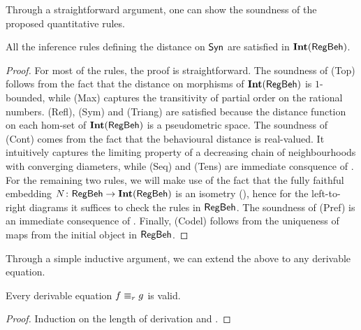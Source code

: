 Through a straightforward argument, one can show the soundness of the proposed quantitative rules.
\begin{lemma}\label{lem:soundness_sublemma}
		All the inference rules defining the distance on $\mathsf{Syn}$ are satisfied in $\mathbf{Int}(\mathsf{RegBeh})$.
	\end{lemma}
	\begin{proof}
		For most of the rules, the proof is straightforward. The soundness of \textsf{(Top)} follows from the fact that the distance on morphisms of $\mathbf{Int}(\mathsf{RegBeh})$ is $1$-bounded, while \textsf{(Max)} captures the transitivity of partial order on the rational numbers. \textsf{(Refl)}, \textsf{(Sym)} and \textsf{(Triang)} are satisfied because the distance function on each hom-set of $\mathbf{Int}(\mathsf{RegBeh})$ is a pseudometric space. The soundness of \textsf{(Cont)} comes from the fact that the behavioural distance is real-valued. It intuitively captures the limiting property of a decreasing chain of neighbourhoods with converging diameters, while \textsf{(Seq)} and \textsf{(Tens)} are immediate consquence of . For the remaining two rules, we will make use of the fact that the fully faithful embedding $N \colon \mathsf{RegBeh} \to \mathbf{Int}(\mathsf{RegBeh})$ is an isometry (), hence for the left-to-right diagrams it suffices to check the rules in $\mathsf{RegBeh}$. The soundness of \textsf{(Pref)} is an immediate consequence of . Finally, \textsf{(Codel)} follows from the uniqueness of maps from the initial object in $\mathsf{RegBeh}$.
		\end{proof}
		Through a simple inductive argument, we can extend the above to any derivable equation.
\begin{theorem}\label{c3:thm:soundness}
Every derivable equation $f \equiv_{r} g$ is valid.
\end{theorem}
\begin{proof}
	Induction on the length of derivation and .
\end{proof}

